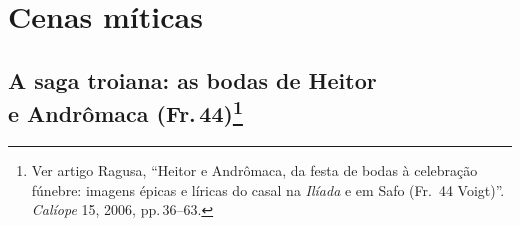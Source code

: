 \chapter{Cenas míticas}

\section[A saga troiana: as bodas de Heitor e Andrômaca (Fr.\,44)]{A saga troiana: as bodas de Heitor\\e Andrômaca (Fr.\,44)\protect\footnote{\MakeUppercase{V}er
artigo \MakeUppercase{R}agusa, ``\MakeUppercase{H}eitor e \MakeUppercase{A}ndrômaca, da festa de bodas à celebração fúnebre:
imagens épicas e líricas do casal na \textit{\MakeUppercase{I}líada} e em \MakeUppercase{S}afo (\MakeUppercase{F}r.~44 Voigt)''.
\textit{\MakeUppercase{C}alíope} 15, 2006, pp.\,36--63.}}

